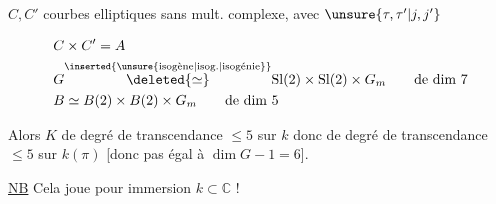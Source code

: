 $C,C'$ courbes elliptiques sans mult. complexe, avec $\unsure{\tau,\tau'|j,j'}$ 

\[
\begin{aligned}
&C\times C'=A\\
&G\overset{\inserted{\text{\unsure{isogène|isog.|isogénie}}}}{\deleted{\simeq}}\mathrm{Sl}(2)\times\mathrm{Sl}(2)\times G_m\qquad\text{de dim }7\\
&B\simeq B(2)\times B(2)\times G_m\qquad\text{de dim }5
\end{aligned}
\]

Alors $K$ de degré de transcendance $\leq5$ sur $k$
donc de degré de transcendance $\leq5$ sur $k(\pi)$
[donc pas égal à $\dim G-1=6$].

\uline{NB} Cela joue pour \uline{} immersion $k\subset\mathbb C$ !

